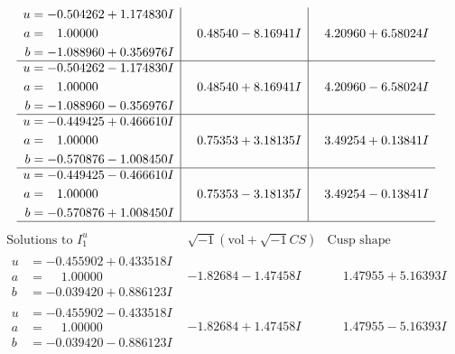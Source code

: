 \documentclass[1p]{elsarticle_modified}
\theoremstyle{definition}
\newcommand{\I}{\sqrt{-1}}
\begin{document}
$$\begin{array}{c|c|c}
\begin{aligned}
u &= -0.504262 + 1.174830 I \\
a &= \phantom{-}1.00000\phantom{ +0.000000I} \\
b &= -1.088960 + 0.356976 I\end{aligned}
 & \phantom{-}0.48540 - 8.16941 I & \phantom{-}4.20960 + 6.58024 I \\ \hline\begin{aligned}
u &= -0.504262 - 1.174830 I \\
a &= \phantom{-}1.00000\phantom{ +0.000000I} \\
b &= -1.088960 - 0.356976 I\end{aligned}
 & \phantom{-}0.48540 + 8.16941 I & \phantom{-}4.20960 - 6.58024 I \\ \hline\begin{aligned}
u &= -0.449425 + 0.466610 I \\
a &= \phantom{-}1.00000\phantom{ +0.000000I} \\
b &= -0.570876 - 1.008450 I\end{aligned}
 & \phantom{-}0.75353 + 3.18135 I & \phantom{-}3.49254 + 0.13841 I \\ \hline\begin{aligned}
u &= -0.449425 - 0.466610 I \\
a &= \phantom{-}1.00000\phantom{ +0.000000I} \\
b &= -0.570876 + 1.008450 I\end{aligned}
 & \phantom{-}0.75353 - 3.18135 I & \phantom{-}3.49254 - 0.13841 I\\
 \hline 
 \end{array}$$\newpage$$\begin{array}{c|c|c}  
\text{Solutions to }I^u_{1}& \I (\text{vol} + \sqrt{-1}CS) & \text{Cusp shape}\\
 \hline 
\begin{aligned}
u &= -0.455902 + 0.433518 I \\
a &= \phantom{-}1.00000\phantom{ +0.000000I} \\
b &= -0.039420 + 0.886123 I\end{aligned}
 & -1.82684 - 1.47458 I & \phantom{-}1.47955 + 5.16393 I \\ \hline\begin{aligned}
u &= -0.455902 - 0.433518 I \\
a &= \phantom{-}1.00000\phantom{ +0.000000I} \\
b &= -0.039420 - 0.886123 I\end{aligned}
 & -1.82684 + 1.47458 I & \phantom{-}1.47955 - 5.16393 I \\ \hline\begin{aligned}

\end{aligned}
\end{array}$$
\end{document}
